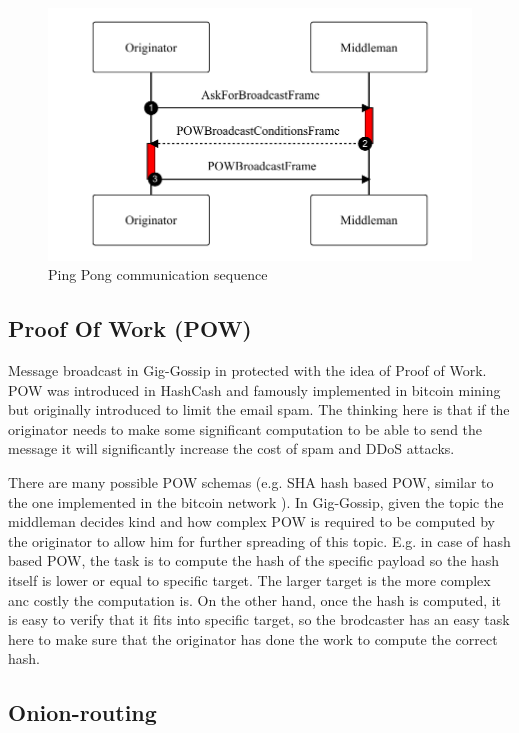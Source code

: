 \documentclass{article}
\begin{document}
\begin{figure}
	\centering
	\includegraphics[scale=0.7]{PingPong.pdf}
	\caption{Ping Pong communication sequence}
	\label{fig:fr:pingpong}
\end{figure}

\subsection{Proof Of Work (POW)}
Message broadcast in Gig-Gossip in protected with the idea of Proof of Work. POW was introduced in HashCash \cite{Hashcash} and famously implemented in bitcoin mining but originally introduced to limit the email spam. The thinking here is that if the originator needs to make some significant computation to be able to send the message it will significantly increase the cost of spam and DDoS attacks. 

There are many possible POW schemas (e.g. SHA hash based POW, similar to the one implemented in the bitcoin network \cite{nakamoto2009bitcoin}). In Gig-Gossip, given the topic the middleman decides kind and how complex POW is required to be computed by the originator to allow him for further spreading of this topic. E.g. in case of hash based POW, the task is to compute the hash of the specific payload so the hash itself is lower or equal to specific target. The larger target is the more complex anc costly the computation is. On the other hand, once the hash is computed, it is easy to verify that it fits into specific target, so the brodcaster has an easy task here to make sure that the originator has done the work to compute the correct hash.

\subsection{Onion-routing}
\end{document}
